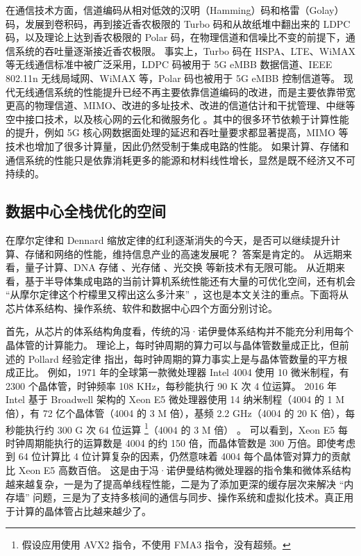 在通信技术方面，信道编码从相对低效的汉明（Hamming）码和格雷（Golay）码，发展到卷积码，再到接近香农极限的 Turbo 码和从故纸堆中翻出来的 LDPC 码，以及理论上达到香农极限的 Polar 码，在物理信道和信噪比不变的前提下，通信系统的吞吐量逐渐接近香农极限。
事实上，Turbo 码在 HSPA、LTE、WiMAX 等无线通信标准中被广泛采用，LDPC 码被用于 5G eMBB 数据信道、IEEE 802.11n 无线局域网、WiMAX 等，Polar 码也被用于 5G eMBB 控制信道等。
现代无线通信系统的性能提升已经不再主要依靠信道编码的改进，而是主要依靠带宽更高的物理信道、MIMO、改进的多址技术、改进的信道估计和干扰管理、中继等空中接口技术，以及核心网的云化和微服务化 \cite{3gpp-23501,3gpp-38300}。其中的很多环节依赖于计算性能的提升，例如 5G 核心网数据面处理的延迟和吞吐量要求都显著提高，MIMO 等技术也增加了很多计算量，因此仍然受制于集成电路的性能。
如果计算、存储和通信系统的性能只是依靠消耗更多的能源和材料线性增长，显然是既不经济又不可持续的。

\subsection{数据中心全栈优化的空间}


在摩尔定律和 Dennard 缩放定律的红利逐渐消失的今天，是否可以继续提升计算、存储和网络的性能，维持信息产业的高速发展呢？
答案是肯定的。
从远期来看，量子计算、DNA 存储 \cite{bornholt2016dna}、光存储 \cite{glass-a-new-media-for-a-new-era}、光交换 \cite{farrington2011helios} 等新技术有无限可能。
从近期来看，基于半导体集成电路的当前计算机系统性能还有大量的可优化空间，还有机会 ``从摩尔定律这个柠檬里又榨出这么多汁来'' \cite{threebody}，这也是本文关注的重点。下面将从芯片体系结构、操作系统、软件和数据中心四个方面分别讨论。

首先，从芯片的体系结构角度看，传统的冯·诺伊曼体系结构并不能充分利用每个晶体管的计算能力。
理论上，每时钟周期的算力可以与晶体管数量成正比，但前述的 Pollard 经验定律 \cite{pollackpollack} 指出，每时钟周期的算力事实上是与晶体管数量的平方根成正比。
例如，1971 年的全球第一款微处理器 Intel 4004 使用 10 微米制程，有 2300 个晶体管，时钟频率 108 KHz，每秒能执行 90 K 次 4 位运算。
2016 年 Intel 基于 Broadwell 架构的 Xeon E5 微处理器使用 14 纳米制程（4004 的 1 M 倍），有 72 亿个晶体管（4004 的 3 M 倍），基频 2.2 GHz（4004 的 20 K 倍），每秒能执行约 300 G 次 64 位运算 \footnote{假设应用使用 AVX2 指令，不使用 FMA3 指令，没有超频。}（4004 的 3 M 倍） \cite{intel-e5-v4}。
可以看到，Xeon E5 每时钟周期能执行的运算数是 4004 的约 150 倍，而晶体管数是 300 万倍。即使考虑到 64 位计算比 4 位计算复杂的因素，仍然意味着 4004 每个晶体管对算力的贡献比 Xeon E5 高数百倍。
这是由于冯·诺伊曼结构微处理器的指令集和微体系结构越来越复杂，一是为了提高单线程性能，二是为了添加更深的缓存层次来解决 ``内存墙'' 问题，三是为了支持多核间的通信与同步、操作系统和虚拟化技术。真正用于计算的晶体管占比越来越少了。

